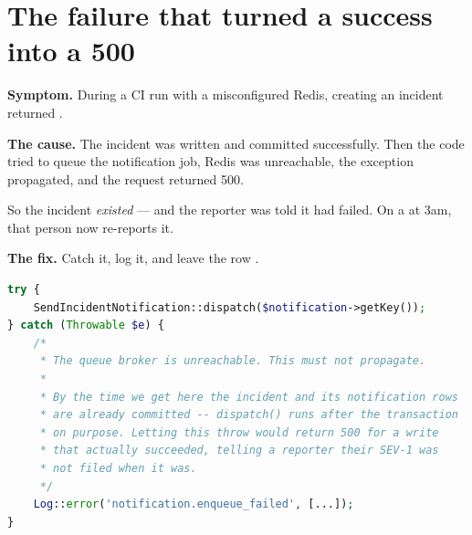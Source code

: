 
\section{The failure that turned a success into a 500}

\textbf{Symptom.} During a CI run with a misconfigured Redis, creating an
incident returned .

\textbf{The cause.} The incident was written and committed successfully. Then the
code tried to queue the notification job, Redis was unreachable, the exception
propagated, and the request returned 500.

So the incident \emph{existed} --- and the reporter was told it had failed. On a
 at 3am, that person now re-reports it.

\textbf{The fix.} Catch it, log it, and leave the row .

\begin{lstlisting}[language=PHP]
try {
    SendIncidentNotification::dispatch($notification->getKey());
} catch (Throwable $e) {
    /*
     * The queue broker is unreachable. This must not propagate.
     *
     * By the time we get here the incident and its notification rows
     * are already committed -- dispatch() runs after the transaction
     * on purpose. Letting this throw would return 500 for a write
     * that actually succeeded, telling a reporter their SEV-1 was
     * not filed when it was.
     */
    Log::error('notification.enqueue_failed', [...]);
}
\end{lstlisting}

